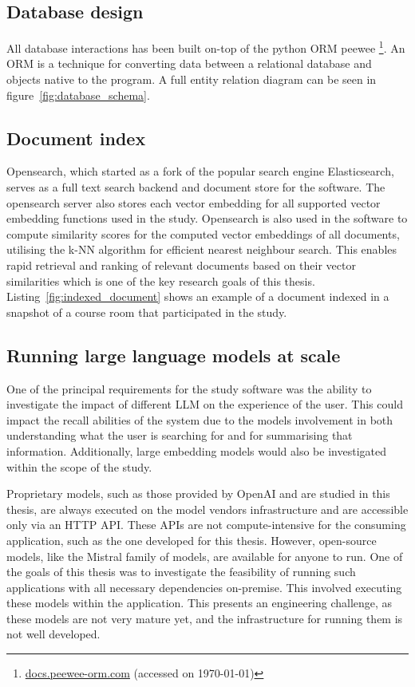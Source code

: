 \subsection{Database design}


All database interactions has been built on-top of the python \gls{ORM} peewee \footnote{\href{http://docs.peewee-orm.com/en/latest/}{docs.peewee-orm.com} (accessed on \today)}. An \gls{ORM} is a technique for converting data between a relational database and objects native to the program. A full entity relation diagram can be seen in figure~\ref{fig:database_schema}.





\subsection{Document index}


Opensearch, which started as a fork of the popular search engine Elasticsearch, serves as a full text search backend and document store for the software. The opensearch server also stores each vector embedding for all supported vector embedding functions used in the study. Opensearch is also used in the software to compute similarity scores for the computed vector embeddings of all documents, utilising the k-NN algorithm for efficient nearest neighbour search. This enables rapid retrieval and ranking of relevant documents based on their vector similarities which is one of the key research goals of this thesis. Listing~\ref{fig:indexed_document} shows an example of a document indexed in a snapshot of a course room that participated in the study.





\subsection{Running large language models at scale}


One of the principal requirements for the study software was the ability to investigate the impact of different \gls{LLM} on the experience of the user. This could impact the recall abilities of the system due to the models involvement in both understanding what the user is searching for and for summarising that information. Additionally, large embedding models would also be investigated within the scope of the study.


Proprietary models, such as those provided by OpenAI and are studied in this thesis, are always executed on the model vendors infrastructure and are accessible only via an HTTP API. These APIs are not compute-intensive for the consuming application, such as the one developed for this thesis. However, open-source models, like the Mistral family of models, are available for anyone to run. One of the goals of this thesis was to investigate the feasibility of running such applications with all necessary dependencies on-premise. This involved executing these models within the application. This presents an engineering challenge, as these models are not very mature yet, and the infrastructure for running them is not well developed.


